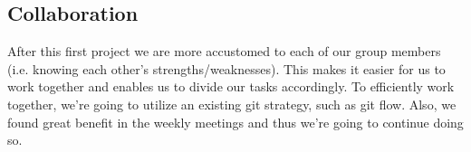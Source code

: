 \documentclass[10pt, a4paper]{article}
\begin{document}
\begin{multicols}{2}
\begin{minipage}{\linewidth}
		\subsection{Collaboration}
		After this first project we are more accustomed to each of our group members (i.e. knowing each other's strengths/weaknesses). This makes it easier for us to work together and enables us to divide our tasks accordingly. To efficiently work together, we're going to utilize an existing git strategy, such as git flow. Also, we found great benefit in the weekly meetings and thus we're going to continue doing so.
	    
	
	
	\end{minipage}
	\end{multicols}
	
\end{document}
